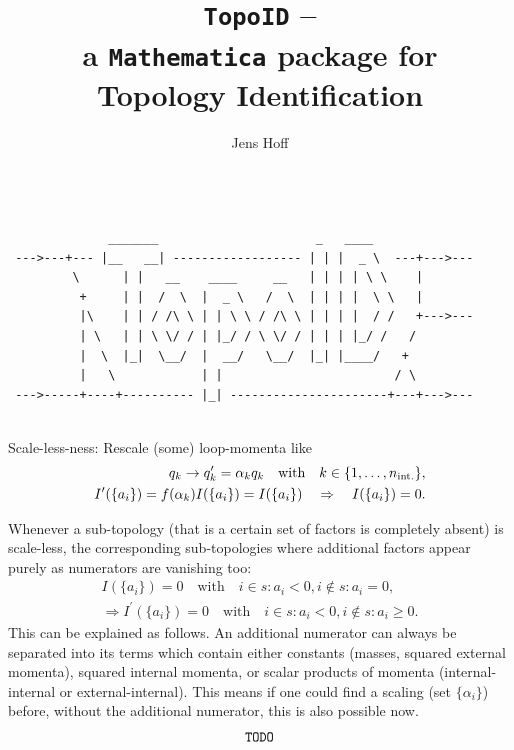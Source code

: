 \documentclass{article}
\title{
  {\tt TopoID} -- \\
  a {\tt Mathematica} package for\\
  Topology Identification
}
\author{Jens Hoff}
\begin{document}
\maketitle

\begin{center}
\begin{verbatim}

              _______                      _   ____
 --->---+--- |__   __| ------------------ | | |  _ \  ---+--->---
         \      | |   __    ____     __   | | | | \ \    |
          +     | |  /  \  |  _ \   /  \  | | | |  \ \   |
          |\    | | / /\ \ | | \ \ / /\ \ | | | |  / /   +--->---
          | \   | | \ \/ / | |_/ / \ \/ / | | | |_/ /   /
          |  \  |_|  \__/  |  __/   \__/  |_| |____/   +
          |   \            | |                        / \
 --->-----+----+---------- |_| ----------------------+---+--->---


\end{verbatim}
\end{center}



\item Scale-less-ness:
  Rescale (some) loop-momenta like
  \begin{align}
    q_k \to q_k^\prime = \alpha_k q_k \quad \text{with} \quad k \in \{
    1, \ldots, n_{\rm int.} \}, \\
    I^\prime(\{ a_i \}) = f({\alpha_k}) I(\{ a_i \}) = I(\{ a_i \})
    \quad \Rightarrow \quad I(\{ a_i \}) = 0.
  \end{align}

\item Whenever a sub-topology (that is a certain set of factors is
  completely absent) is scale-less, the corresponding sub-topologies
  where additional factors appear purely as numerators are vanishing
  too:
  \begin{align}
    I(\{ a_i \}) = 0 \quad \text{with} \quad i \in s: a_i < 0, i \notin
    s: a_i = 0, \\
    \Rightarrow I^\prime(\{ a_i \}) = 0 \quad \text{with} \quad i \in s:
    a_i < 0, i \notin s: a_i \ge 0.
  \end{align}
  This can be explained as follows.  An additional numerator can always
  be separated into its terms which contain either constants (masses,
  squared external momenta), squared internal momenta, or scalar
  products of momenta (internal-internal or external-internal).  This
  means if one could find a scaling (set $\{ \alpha_i \}$) before,
  without the additional numerator, this is also possible now.
  \begin{align}
    {\tt TODO}
  \end{align}
\end{document}
